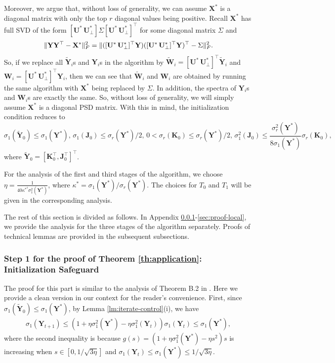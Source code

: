 \documentclass[11pt]{article}
\newcommand{\0}{{\mathbf{0}}}
\newcommand{\1}{{\mathbf{1}}}
\newcommand{\X}{{\mathbf{X}}}
\newcommand{\U}{{\mathbf{U}}}
\newcommand{\K}{{\mathbf{K}}}
\newcommand{\J}{{\mathbf{J}}}
\newcommand{\W}{{\mathbf{W}}}
\newcommand{\Y}{{\mathbf{Y}}}
\newcommand{\F}{{\rm F}}
\begin{document}
{Moreover, we argue that, without loss of generality, we can assume $\X^*$ is a diagonal matrix with only the top $r$ diagonal values being positive. Recall $\X^*$ has full SVD of the form $[\U^* \, \U^*_{\perp}] \Sigma [\U^* \, \U^*_{\perp}]^{\top}$ for some diagonal matrix $\Sigma$ and 
\begin{equation*}
	\|\Y \Y^\top - \X^*\|_\F^2 = \| ([\U^* \, \U^*_{\perp}]^{\top } \Y) ([\U^* \, \U^*_{\perp}]^{\top } \Y)^\top - \Sigma \|_\F^2.
\end{equation*} 
So, if we replace all $\widetilde{\Y}_i$s and $\Y_i$s in the algorithm by $\widetilde{\W}_i = [\U^* \, \U^*_{\perp}]^{\top } \widetilde{\Y}_i$ and $\W_i = [\U^* \, \U^*_{\perp}]^{\top }{\Y}_i$, then we can see that $\widetilde{\W}_i$ and $\W_i$ are obtained by running the same algorithm with $\X^*$ being replaced by $ \Sigma$. In addition, the spectra of $\Y_i$s and $\W_i$s are exactly the same. So, without loss of generality, we will simply assume $\X^*$ is a diagonal PSD matrix. With this in mind, the initialization condition reduces to 
\begin{equation} \label{ineq:new-initilization-condition}
	 \sigma_1(\widetilde{\Y}_0) \leq \sigma_1(\Y^*),\, \sigma_1(\J_0) \leq \sigma_r(\Y^*)/2,\, 0 < \sigma_r(\K_0) \leq \sigma_r(\Y^*)/2, \, \sigma_1^2(\J_0) \leq \frac{\sigma^2_r(\Y^*)}{8 \sigma_1(\Y^*)} \sigma_r(\K_0),
\end{equation} where $\widetilde{\Y}_0 = [\K_0^\top, \J_0^\top ]^\top $. 



For the analysis of the first and third stages of the algorithm, we choose $\eta = \frac{1}{40 \kappa^{*^4} \sigma^2_1(\Y^*) }$, where $\kappa^* = \sigma_1(\Y^*)/\sigma_r(\Y^*)$. The choices for $T_0$ and $T_1$ will be given in the corresponding analysis.

The rest of this section is divided as follows. In Appendix \ref{sec:proof-init}-\ref{sec:proof-local}, we provide the analysis for the three stages of the algorithm separately. Proofs of technical lemmas are provided in the subsequent subsections.

\subsubsection{Step 1 for the proof of Theorem \ref{th:application}: Initialization Safeguard } \label{sec:proof-init}
The proof for this part is similar to the analysis of Theorem B.2 in \cite{chen2023fast}. Here we provide a clean version in our context for the reader's convenience. First, since $\sigma_1(\widetilde{\Y}_0) \leq \sigma_1(\Y^*)$, by Lemma \ref{lm:iterate-control}(i), we have
\begin{equation*}
	\begin{split}
		\sigma_1(\Y_{t+1}) \leq (1 + \eta \sigma^2_1(\Y^*) - \eta \sigma^2_1(\Y_t) ) \sigma_1(\Y_t) \leq \sigma_1(\Y^*),
	\end{split}
\end{equation*} where the second inequality is because $g(s) = (1 + \eta \sigma^2_1(\Y^*) - \eta s^2)s$ is increasing when $s \in [0, 1/\sqrt{3\eta}]$ and $\sigma_1(\Y_t) \leq \sigma_1(\Y^*) \leq  1/\sqrt{3\eta}$.

}
\end{document}

